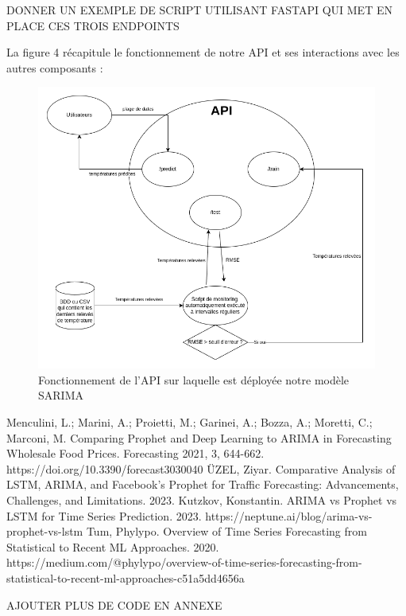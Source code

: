 \documentclass[french]{article}
\begin{document}
    DONNER UN EXEMPLE DE SCRIPT UTILISANT FASTAPI QUI MET EN PLACE CES TROIS ENDPOINTS

    La figure 4 récapitule le fonctionnement de notre API et ses interactions avec les autres composants :

    \begin{figure}[h]
        \includegraphics[width=12cm]{schema_API_E2}
        \centering
        \caption{Fonctionnement de l'API sur laquelle est déployée notre modèle SARIMA}
        \centering
    \end{figure}


    \newpage
    \begin{thebibliography}{4}
         Menculini, L.; Marini, A.; Proietti, M.; Garinei, A.; Bozza, A.; Moretti, C.; Marconi, M. Comparing Prophet and Deep Learning to ARIMA in Forecasting Wholesale Food Prices. Forecasting 2021, 3, 644-662. https://doi.org/10.3390/forecast3030040
         ÜZEL, Ziyar. Comparative Analysis of LSTM, ARIMA, and Facebook’s Prophet for Traffic Forecasting: Advancements, Challenges, and Limitations. 2023. 
         Kutzkov, Konstantin. ARIMA vs Prophet vs LSTM for Time Series Prediction. 2023. https://neptune.ai/blog/arima-vs-prophet-vs-lstm
         Tum, Phylypo. Overview of Time Series Forecasting from Statistical to Recent ML Approaches. 2020. https://medium.com/@phylypo/overview-of-time-series-forecasting-from-statistical-to-recent-ml-approaches-c51a5dd4656a
    \end{thebibliography}

    AJOUTER PLUS DE CODE EN ANNEXE

    
\end{document}
